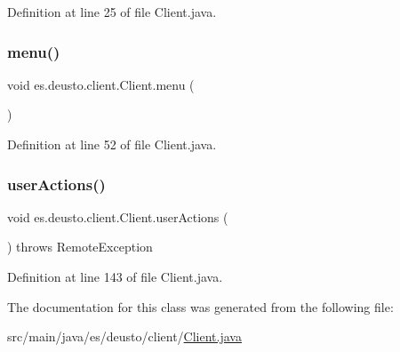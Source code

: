 Definition at line 25 of file Client.\+java.

\mbox{\label{classes_1_1deusto_1_1client_1_1_client_a8fdee4eb01bf96421c91a0bc1fbdcb43}} 
\subsubsection{\texorpdfstring{menu()}{menu()}}
{\footnotesize\ttfamily void es.\+deusto.\+client.\+Client.\+menu (\begin{DoxyParamCaption}{ }\end{DoxyParamCaption})\hspace{0.3cm}{\ttfamily [protected]}}



Definition at line 52 of file Client.\+java.

\mbox{\label{classes_1_1deusto_1_1client_1_1_client_a08731e01aee74e27a7a55ae48c636c84}} 
\subsubsection{\texorpdfstring{user\+Actions()}{userActions()}}
{\footnotesize\ttfamily void es.\+deusto.\+client.\+Client.\+user\+Actions (\begin{DoxyParamCaption}{ }\end{DoxyParamCaption}) throws Remote\+Exception\hspace{0.3cm}{\ttfamily [protected]}}



Definition at line 143 of file Client.\+java.



The documentation for this class was generated from the following file\+:\begin{DoxyCompactItemize}
\item 
src/main/java/es/deusto/client/\hyperlink{_client_8java}{Client.\+java}\end{DoxyCompactItemize}
